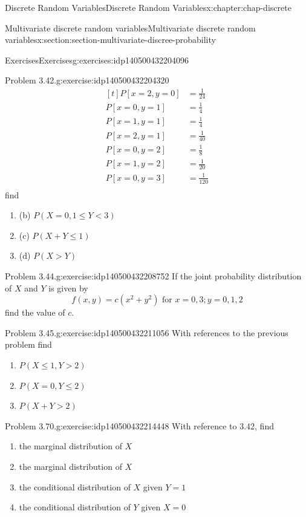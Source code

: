 \documentclass[oneside,10pt,]{book}
\newcommand{\lt}{<}
\newcommand{\gt}{>}
\newcommand{\amp}{&}
\begin{document}
\begin{chapterptx}{Discrete Random Variables}{}{Discrete Random Variables}{}{}{x:chapter:chap-discrete}
\begin{sectionptx}{Multivariate discrete random variables}{}{Multivariate discrete random variables}{}{}{x:section:section-multivariate-discree-probability}
\begin{exercises-subsection}{Exercises}{}{Exercises}{}{}{g:exercises:idp140500432204096}
\begin{divisionexercise}{1}{Problem 3.42.}{}{g:exercise:idp140500432204320}
\begin{equation*}
\begin{aligned}[t]
P[x=2, y=0] \amp = \frac{1}{24}\\
P[x=0, y=1] \amp = \frac{1}{4}\\
P[x=1, y=1] \amp = \frac{1}{4}\\
P[x=2, y=1] \amp = \frac{1}{40}\\
P[x=0, y=2] \amp = \frac{1}{8}\\
P[x=1, y=2] \amp = \frac{1}{20}\\
P[x=0, y=3] \amp = \frac{1}{120}\\
\end{aligned}
\end{equation*}
find%
\begin{enumerate}[label=(\alph*)]
\item{}(b) \(P(X = 0, 1\le Y \lt 3)\)%
\item{}(c) \(P(X + Y \le 1)\)%
\item{}(d) \(P(X \gt Y)\)%
\end{enumerate}
%
\end{divisionexercise}%
\begin{divisionexercise}{2}{Problem 3.44.}{}{g:exercise:idp140500432208752}%
If the joint probability distribution of \(X\) and \(Y\) is given by%
\begin{equation*}
f(x, y) = c(x^2+y^2) \text{ for } x=0, 3; y=0, 1, 2
\end{equation*}
find the value of \(c\).%
\end{divisionexercise}%
\begin{divisionexercise}{3}{Problem 3.45.}{}{g:exercise:idp140500432211056}%
With references to the previous problem find%
\begin{enumerate}[label=(\alph*)]
\item{}\(\displaystyle P(X\le 1, Y \gt 2)\)%
\item{}\(\displaystyle P(X=0, Y\le 2)\)%
\item{}\(\displaystyle P(X +Y \gt 2)\)%
\end{enumerate}
%
\end{divisionexercise}%
\begin{divisionexercise}{4}{Problem 3.70.}{}{g:exercise:idp140500432214448}%
With reference to 3.42, find%
\begin{enumerate}[label=(\alph*)]
\item{}the marginal distribution of \(X\)%
\item{}the marginal distribution of \(X\)%
\item{}the conditional distribution of \(X\) given \(Y=1\)%
\item{}the conditional distribution of \(Y\) given \(X=0\)%

\end{enumerate}
\end{divisionexercise}
\end{exercises-subsection}
\end{sectionptx}
\end{chapterptx}
\end{document}
